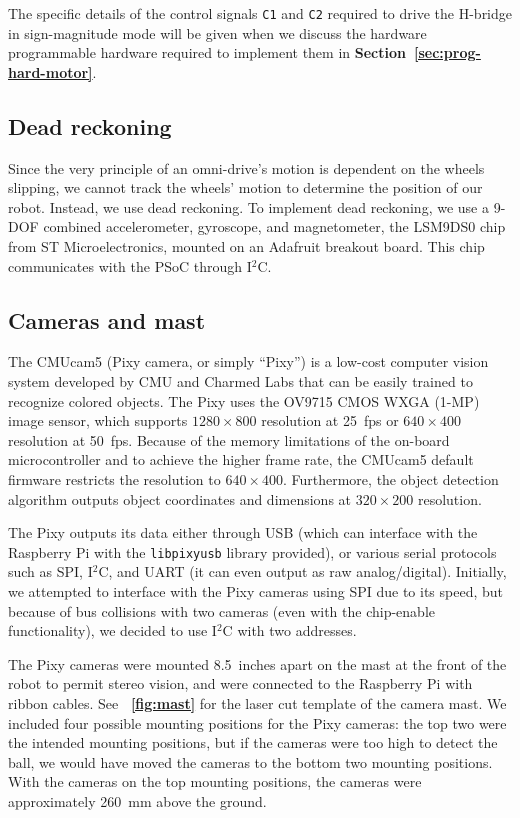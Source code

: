\documentclass[letterpaper, 11pt]{article}
\newcommand*{\figref}[1]{\textbf{\figurename~\ref{#1}}}
\newcommand*{\secref}[1]{\textbf{Section~\ref{#1}}}
\newcommand{\iic}{I$^2$C\xspace}
\begin{document}
\begin{enumerate}[label=\textbf{\arabic*.}]
The specific details of the control signals \texttt{C1} and \texttt{C2} required to drive the H-bridge in sign-magnitude mode will be given when we discuss the hardware programmable hardware required to implement them in \secref{sec:prog-hard-motor}.

\subsection{Dead reckoning}
Since the very principle of an omni-drive's motion is dependent on the wheels slipping, we cannot track the wheels' motion to determine the position of our robot. Instead, we use dead reckoning. To implement dead reckoning, we use a 9-DOF combined accelerometer, gyroscope, and magnetometer, the LSM9DS0 chip from ST Microelectronics, mounted on an Adafruit breakout board. This chip communicates with the PSoC through \iic.

\subsection{Cameras and mast}
The CMUcam5 (Pixy camera, or simply ``Pixy'') is a low-cost computer vision system developed by CMU and Charmed Labs that can be easily trained to recognize colored objects. The Pixy uses the OV9715 CMOS WXGA (1-MP) image sensor, which supports $1280\times 800$ resolution at \SI{25}{fps} or $640\times 400$ resolution at \SI{50}{fps}. Because of the memory limitations of the on-board microcontroller and to achieve the higher frame rate, the CMUcam5 default firmware restricts the resolution to $640\times 400$. Furthermore, the object detection algorithm outputs object coordinates and dimensions at $320\times 200$ resolution.

The Pixy outputs its data either through USB (which can interface with the Raspberry Pi with the \texttt{libpixyusb} library provided), or various serial protocols such as SPI, \iic, and UART (it can even output as raw analog/digital). Initially, we attempted to interface with the Pixy cameras using SPI due to its speed, but because of bus collisions with two cameras (even with the chip-enable functionality), we decided to use \iic with two addresses.

The Pixy cameras were mounted \SI{8.5}{inches} apart on the mast at the front of the robot to permit stereo vision, and were connected to the Raspberry Pi with ribbon cables. See \figref{fig:mast} for the laser cut template of the camera mast. We included four possible mounting positions for the Pixy cameras: the top two were the intended mounting positions, but if the cameras were too high to detect the ball, we would have moved the cameras to the bottom two mounting positions. With the cameras on the top mounting positions, the cameras were approximately \SI{260}{mm} above the ground.


\end{enumerate}
\end{document}

